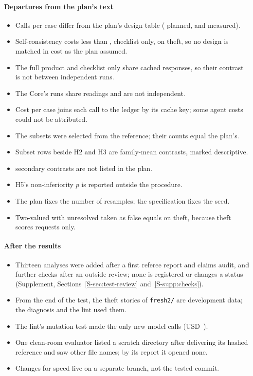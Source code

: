 \paragraph{Departures from the plan's text}
\begin{itemize}[leftmargin=1.2em,itemsep=1pt]
\item Calls per case differ from the plan's design table (\casepath \sthreePlanCallsCasePath{} planned, \sthreeCasePathTenCalls{} and \sthreeCasePathThCalls{} measured).
\item Self-consistency costs less than \casepath, checklist only, on theft, so no design is matched in cost as the plan assumed.
\item The full product and checklist only share cached responses, so their contrast is not between independent runs.
\item The Core's runs share readings and are not independent.
\item Cost per case joins each call to the ledger by its cache key; some agent costs could not be attributed.
\item The subsets were selected from the reference; their counts equal the plan's.
\item Subset rows beside H2 and H3 are family-mean contrasts, marked descriptive.
\item \sthreeSecondaryVsCasePath{} secondary contrasts are not listed in the plan.
\item H5's non-inferiority $p$ is reported outside the procedure.
\item The plan fixes the number of resamples; the specification fixes the seed.
\item Two-valued with unresolved taken as false equals \casepath on theft, because theft scores requests only.
\end{itemize}

\paragraph{After the results}
\begin{itemize}[leftmargin=1.2em,itemsep=1pt]
\item Thirteen analyses were added after a first referee report and claims audit, and further checks after an outside review; none is registered or changes a status (Supplement, Sections~\ref{S-sec:test-review} and~\ref{S-supp:checks}).
\item From the end of the test, the theft stories of \texttt{fresh2/} are development data; the diagnosis and the lint used them.
\item The lint's mutation test made the only new model calls (USD~\spostMutSpendUSD).
\item One clean-room evaluator listed a scratch directory after delivering its hashed reference and saw other file names; by its report it opened none.
\item Changes for speed live on a separate branch, not the tested commit.
\end{itemize}
